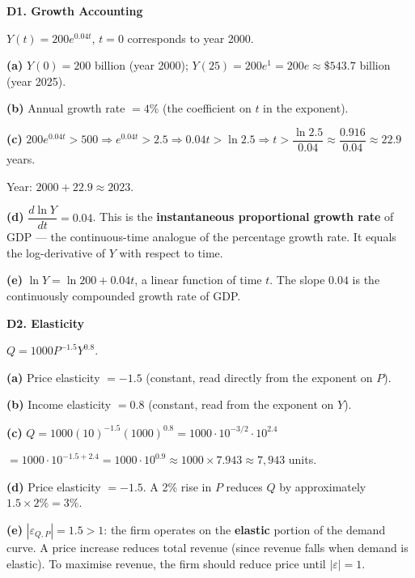 \documentclass[12pt, a4paper]{article}
\theoremstyle{definition}
\begin{document}
\begin{solbox}
\textbf{D1. Growth Accounting}

$Y(t) = 200e^{0.04t}$, $t=0$ corresponds to year 2000.

\textbf{(a)} $Y(0) = 200$ billion (year 2000); $Y(25) = 200e^{1} = 200e \approx \$543.7$ billion (year 2025).

\textbf{(b)} Annual growth rate $= 4\%$ (the coefficient on $t$ in the exponent).

\textbf{(c)} $200e^{0.04t}>500 \Rightarrow e^{0.04t}>2.5 \Rightarrow 0.04t>\ln 2.5 \Rightarrow t>\dfrac{\ln 2.5}{0.04}\approx\dfrac{0.916}{0.04}\approx 22.9$ years.

Year: $2000+22.9 \approx 2023$.

\textbf{(d)} $\dfrac{d\ln Y}{dt} = 0.04$. This is the \textbf{instantaneous proportional growth rate} of GDP --- the continuous-time analogue of the percentage growth rate. It equals the log-derivative of $Y$ with respect to time.

\textbf{(e)} $\ln Y = \ln 200 + 0.04t$, a linear function of time $t$. The slope $0.04$ is the continuously compounded growth rate of GDP.
\end{solbox}

\begin{solbox}
\textbf{D2. Elasticity}

$Q = 1000P^{-1.5}Y^{0.8}$.

\textbf{(a)} Price elasticity $= -1.5$ (constant, read directly from the exponent on $P$).

\textbf{(b)} Income elasticity $= 0.8$ (constant, read from the exponent on $Y$).

\textbf{(c)} $Q = 1000(10)^{-1.5}(1000)^{0.8} = 1000\cdot 10^{-3/2}\cdot 10^{2.4}$

$= 1000\cdot 10^{-1.5+2.4} = 1000\cdot 10^{0.9} \approx 1000\times 7.943 \approx 7{,}943$ units.

\textbf{(d)} Price elasticity $=-1.5$. A 2\% rise in $P$ reduces $Q$ by approximately $1.5\times 2\% = 3\%$.

\textbf{(e)} $|\varepsilon_{Q,P}| = 1.5 > 1$: the firm operates on the \textbf{elastic} portion of the demand curve. A price increase reduces total revenue (since revenue falls when demand is elastic). To maximise revenue, the firm should reduce price until $|\varepsilon|=1$.
\end{solbox}
\end{document}
